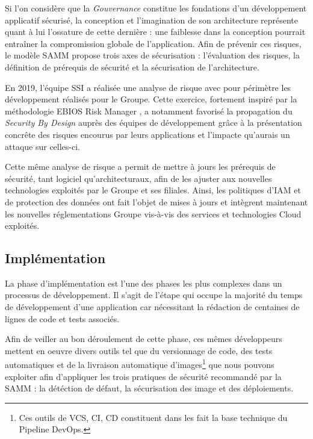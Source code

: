 Si l'on considère que la \emph{Gouvernance} constitue les fondations d'un développement applicatif sécurisé, la conception et 
l'imagination de son architecture représente quant à lui l'ossature de cette dernière : une faiblesse dans la conception pourrait
entraîner la compromission globale de l'application. 
\newline Afin de prévenir ces risques, le modèle \ac{SAMM} propose trois axes de sécurisation : l'évaluation des risques, 
la définition de prérequis de sécurité et la sécurisation de l'architecture.

En 2019, l'équipe \ac{SSI} a réalisée une analyse de risque avec pour périmètre les développement réalisés pour le Groupe. 
Cette exercice, fortement inspiré par la méthodologie EBIOS Risk Manager \autocite{ebios_rm_anssi_2018}, a notamment favorisé 
la propagation du \emph{Security By Design} auprès des équipes de développement grâce à la présentation concrête des risques 
encourus par leurs applications et l'impacte qu'aurais un attaque sur celles-ci.

Cette même analyse de risque a permit de mettre à jours les prérequis de sécurité, tant logiciel qu'architecturaux, afin de les
ajuster aux nouvelles technologies exploités par le Groupe et ses filiales. Ainsi, les politiques d’\ac{IAM}
et de protection des données ont fait l’objet de mises à jours et intègrent maintenant les nouvelles réglementations Groupe 
vis-à-vis des services et technologies Cloud exploités.

\subsection{Implémentation}

La phase d'implémentation est l'une des phases les plus complexes dans un processus de développement. Il s'agit de l'étape
qui occupe la majorité du temps de développement d'une application car nécessitant la rédaction de centaines de lignes de 
code et tests associés.

Afin de veiller au bon déroulement de cette phase, ces mêmes développeurs mettent en oeuvre divers outils tel que du versionnage
de code, des tests automatiques et de la livraison automatique d'images\footnote{Ces outils de \ac{VCS}, \ac{CI}, \ac{CD} constituent
dans les fait la base technique du Pipeline DevOps.} que nous pouvons exploiter afin d'appliquer les trois pratiques de sécurité 
recommandé par la \ac{SAMM} : la détéction de défaut, la sécurisation des image et des déploiements.

